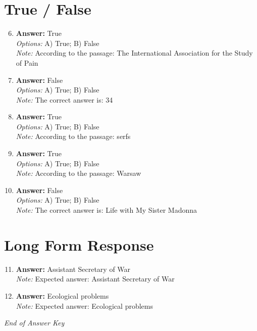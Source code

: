 \documentclass[12pt]{article}
\begin{document}
\section*{True / False}
\begin{enumerate}[label=\arabic*.]
\setcounter{enumi}{5}
\item \textbf{Answer:} True
\\ \textit{Options:} A) True; B) False
\\ \textit{Note:} According to the passage: The International Association for the Study of Pain
\item \textbf{Answer:} False
\\ \textit{Options:} A) True; B) False
\\ \textit{Note:} The correct answer is: 34
\item \textbf{Answer:} True
\\ \textit{Options:} A) True; B) False
\\ \textit{Note:} According to the passage: serfs
\item \textbf{Answer:} True
\\ \textit{Options:} A) True; B) False
\\ \textit{Note:} According to the passage: Warsaw
\item \textbf{Answer:} False
\\ \textit{Options:} A) True; B) False
\\ \textit{Note:} The correct answer is: Life with My Sister Madonna
\end{enumerate}

\section*{Long Form Response}
\begin{enumerate}[label=\arabic*.]
\setcounter{enumi}{10}
\item \textbf{Answer:} Assistant Secretary of War
\\ \textit{Note:} Expected answer: Assistant Secretary of War
\item \textbf{Answer:} Ecological problems
\\ \textit{Note:} Expected answer: Ecological problems
\end{enumerate}

\vfill
\noindent\textit{End of Answer Key}
\end{document}
